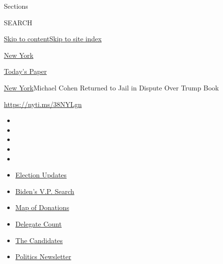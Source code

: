 Sections

SEARCH

\protect\hyperlink{site-content}{Skip to
content}\protect\hyperlink{site-index}{Skip to site index}

\href{https://www.nytimes.com/section/nyregion}{New York}

\href{https://myaccount.nytimes.com/auth/login?response_type=cookie\&client_id=vi}{}

\href{https://www.nytimes.com/section/todayspaper}{Today's Paper}

\href{/section/nyregion}{New York}\textbar{}Michael Cohen Returned to
Jail in Dispute Over Trump Book

\url{https://nyti.ms/38NYLgn}

\begin{itemize}
\item
\item
\item
\item
\item
\end{itemize}

\begin{itemize}
\item
  \href{https://www.nytimes.com/2020/07/31/us/elections/biden-vs-trump.html?action=click\&pgtype=Article\&state=default\&region=TOP_BANNER\&context=storylines_menu}{Election
  Updates}
\item
  \href{https://www.nytimes.com/article/biden-vice-president-2020.html?action=click\&pgtype=Article\&state=default\&region=TOP_BANNER\&context=storylines_menu}{Biden's
  V.P. Search}
\item
  \href{https://www.nytimes.com/interactive/2020/07/24/us/politics/trump-biden-campaign-donors.html?action=click\&pgtype=Article\&state=default\&region=TOP_BANNER\&context=storylines_menu}{Map
  of Donations}
\item
  \href{https://www.nytimes.com/interactive/2020/us/elections/delegate-count-primary-results.html?action=click\&pgtype=Article\&state=default\&region=TOP_BANNER\&context=storylines_menu}{Delegate
  Count}
\item
  \href{https://www.nytimes.com/interactive/2019/us/politics/2020-presidential-candidates.html?action=click\&pgtype=Article\&state=default\&region=TOP_BANNER\&context=storylines_menu}{The
  Candidates}
\item
  \href{https://www.nytimes.com/newsletters/politics?action=click\&pgtype=Article\&state=default\&region=TOP_BANNER\&context=storylines_menu}{Politics
  Newsletter}
\end{itemize}

